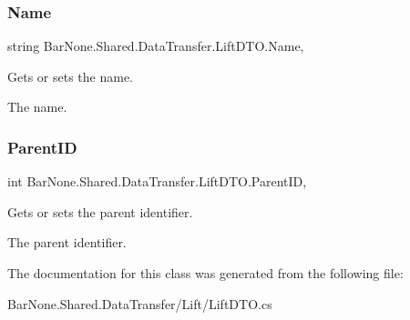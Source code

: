 \subsubsection{\texorpdfstring{Name}{Name}}
{\footnotesize\ttfamily string Bar\+None.\+Shared.\+Data\+Transfer.\+Lift\+D\+T\+O.\+Name\hspace{0.3cm}{\ttfamily [get]}, {\ttfamily [set]}}



Gets or sets the name. 

The name. \mbox{\label{class_bar_none_1_1_shared_1_1_data_transfer_1_1_lift_d_t_o_ac11e0b4131af672f57744b7522a44ba3}} 
\subsubsection{\texorpdfstring{Parent\+ID}{ParentID}}
{\footnotesize\ttfamily int Bar\+None.\+Shared.\+Data\+Transfer.\+Lift\+D\+T\+O.\+Parent\+ID\hspace{0.3cm}{\ttfamily [get]}, {\ttfamily [set]}}



Gets or sets the parent identifier. 

The parent identifier. 

The documentation for this class was generated from the following file\+:\begin{DoxyCompactItemize}
\item 
Bar\+None.\+Shared.\+Data\+Transfer/\+Lift/Lift\+D\+T\+O.\+cs\end{DoxyCompactItemize}
